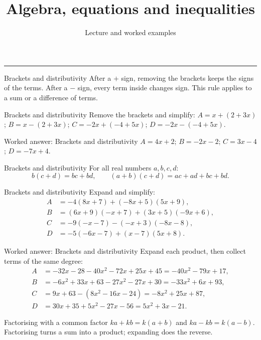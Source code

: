 \documentclass[aspectratio=169,10pt]{beamer}
\title{Algebra, equations and inequalities}
\subtitle{Lecture and worked examples}
\date{}
\author{}
\begin{document}
\begin{frame}[plain]
\vfill
{\inserttitle\par}
\medskip
{\insertsubtitle\par}
\medskip
{\rule{\textwidth}{.5pt}}
\vfill
\end{frame}
\begin{frame}{Brackets and distributivity}
After a \(+\) sign, removing the brackets keeps the signs of the terms. After a \(-\) sign, every term inside changes sign. This rule applies to a sum or a difference of terms.
\end{frame}
\begin{frame}{Brackets and distributivity}
Remove the brackets and simplify: \(A=x+(2+3x)\); \(B=x-(2+3x)\); \(C=-2x+(-4+5x)\); \(D=-2x-(-4+5x)\).
\end{frame}
\begin{frame}{Worked answer: Brackets and distributivity}
\(A=4x+2\); \(B=-2x-2\); \(C=3x-4\); \(D=-7x+4\).
\end{frame}
\begin{frame}{Brackets and distributivity}
For all real numbers \(a,b,c,d\):
\[b(c+d)=bc+bd,\qquad(a+b)(c+d)=ac+ad+bc+bd.\]
\end{frame}
\begin{frame}{Brackets and distributivity}
Expand and simplify:
\[\begin{aligned}
A&=-4(8x+7)+(-8x+5)(5x+9),\\
B&=(6x+9)(-x+7)+(3x+5)(-9x+6),\\
C&=-9(-x-7)-(-x+3)(-8x-8),\\
D&=-5(-6x-7)+(x-7)(5x+8).
\end{aligned}\]
\end{frame}
\begin{frame}{Worked answer: Brackets and distributivity}
Expand each product, then collect terms of the same degree:
\[\begin{aligned}
A&=-32x-28-40x^2-72x+25x+45=-40x^2-79x+17,\\
B&=-6x^2+33x+63-27x^2-27x+30=-33x^2+6x+93,\\
C&=9x+63-(8x^2-16x-24)=-8x^2+25x+87,\\
D&=30x+35+5x^2-27x-56=5x^2+3x-21.
\end{aligned}\]
\end{frame}
\begin{frame}{Factorising with a common factor}
\(ka+kb=k(a+b)\) and \(ka-kb=k(a-b)\). Factorising turns a sum into a product; expanding does the reverse.
\end{frame}
\end{document}
